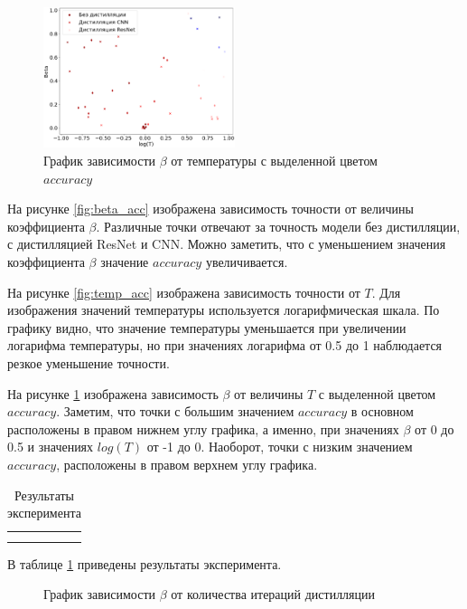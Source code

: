 \documentclass[12pt, twoside]{article}
\begin{document}
\begin{figure}[!ht]
    \centering
    \includegraphics[width=0.5\textwidth]{scatter_temp_beta.eps}
    \caption{График зависимости $\beta$ от температуры с выделенной цветом $accuracy$}
    \label{fig:temp_beta}
\end{figure}

На рисунке \ref{fig:beta_acc} изображена зависимость точности от величины коэффициента $\beta$. Различные точки отвечают за точность модели без дистилляции, с дистилляцией ResNet и CNN. Можно заметить, что с уменьшением значения коэффициента $\beta$ значение $accuracy$ увеличивается.

На рисунке \ref{fig:temp_acc} изображена зависимость точности от $T$. Для изображения значений температуры используется логарифмическая шкала. По графику видно, что значение температуры уменьшается при увеличении логарифма температуры, но при значениях логарифма от 0.5 до 1 наблюдается резкое уменьшение точности.

На рисунке \ref{fig:temp_beta} изображена зависимость $\beta$ от величины $T$ с выделенной цветом $accuracy$. Заметим, что точки с большим значением $accuracy$ в основном расположены в правом нижнем углу графика, а именно, при значениях $\beta$ от 0 до 0.5 и значениях $log(T)$ от -1 до 0. Наоборот, точки с низким значением $accuracy$, расположены в правом верхнем углу графика.

\begin{table}[h]
    \centering
    \begin{tabular}{c|c}
         &  \\
         & 
    \end{tabular}
    \caption{Результаты эксперимента}
    \label{tab:experiment_results}
\end{table}

В таблице \ref{tab:experiment_results} приведены результаты эксперимента.

\begin{figure}[h]
    \centering
    \caption{График зависимости $\beta$ от количества итераций дистилляции}
    \label{fig:iter_beta}
\end{figure}
\end{document}
